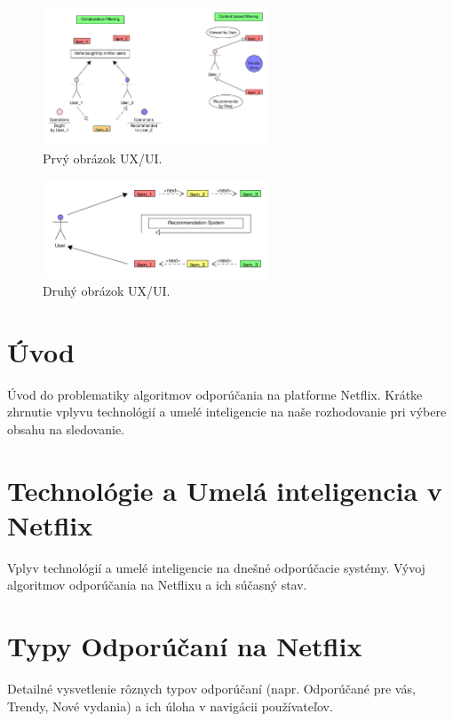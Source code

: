 \documentclass[10pt,twocolumn,twoside,slovak,a4paper]{article}
\begin{document}
\begin{figure}[h!]
  \centering
  \includegraphics[width=0.6\textwidth]{Images/Filtering_pdf.pdf} %
  \caption{Prvý obrázok UX/UI.}
\end{figure}

\begin{figure}[h!]
  \centering
  \includegraphics[width=0.6\textwidth]{Images/RecommendationSystem_pdf.pdf} %
  \caption{Druhý obrázok UX/UI.}
\end{figure}


\section{Úvod}
Úvod do problematiky algoritmov odporúčania na platforme Netflix.
Krátke zhrnutie vplyvu technológií a umelé inteligencie na naše rozhodovanie pri výbere obsahu na sledovanie.

\section{Technológie a Umelá inteligencia v Netflix}
Vplyv technológií a umelé inteligencie na dnešné odporúčacie systémy.
Vývoj algoritmov odporúčania na Netflixu a ich súčasný stav.

\section{Typy Odporúčaní na Netflix}
Detailné vysvetlenie rôznych typov odporúčaní (napr. Odporúčané pre vás, Trendy, Nové vydania) a ich úloha v navigácii používateľov.
\end{document}
